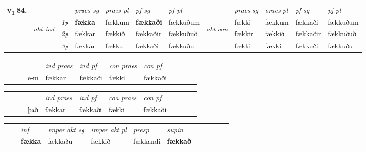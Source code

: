 \begin{tabular}{llllllllllll} \toprule
\multirow{4}{*}{{{\textbf{v{\textsubscript{1}}} \Large{\textbf{84.}}}}}  & &   &  \textit{praes sg}  & \textit{praes pl}  &\textit{ pf sg} & \textit{pf pl} &  &  \textit{praes sg}  & \textit{praes pl}  & \textit{pf sg} & \textit{pf pl } \\*
	\cmidrule{4-7} \cmidrule{9-12}
 & \multirow{3}{*}{\begin{turn}{90}\textit{akt ind}\end{turn}} & {\textit{1p}} & \textbf{fækka} & fækkum    & \textbf{fækkaði} & fækkuðum & \multirow{3}{*}{\begin{turn}{90}\textit{akt con}\end{turn}} &fækki & fækkum & fækkaði & fækkuðum\\*
& &  {\textit{2p}} &  fækkar  & fækkið   & fækkaðir & fækkuðuð & & fækkir & fækkið & fækkaðir & fækkuðuð \\*
& &  {\textit{3p}} & fækkar & fækka   & fækkaði & fækkuðu & & fækki & fækki& fækkaði & fækkuðu  \\*
\cmidrule{4-7} \cmidrule{9-12}
\end{tabular}


\begin{tabular}{llllllllllll}
 & &  & &  \textit{ind praes} & \textit{ind pf} & \textit{con praes} & \textit{con pf} \\*
&  & & e-m & fækkar & fækkaði & fækki & fækkaði \\*
\cmidrule{5-9}
\end{tabular}


\begin{tabular}{llllllllllll}
 & &  & &  \textit{ind praes} & \textit{ind pf} & \textit{con praes} & \textit{con pf} \\*
&  & & það & fækkar & fækkaði & fækki & fækkaði \\*
\cmidrule{5-9}
\end{tabular}


\begin{tabular}{llllllllllll}
 & & \textit{inf} & \textit{imper akt sg} & \textit{imper akt pl}   & \textit{presp} & \textit{supin}       \\*
  & & \textbf{fækka} & fækkaðu  & fækkið   & fækkandi &  \textbf{fækkað}   \\*
\cmidrule{1-12}
\end{tabular}



